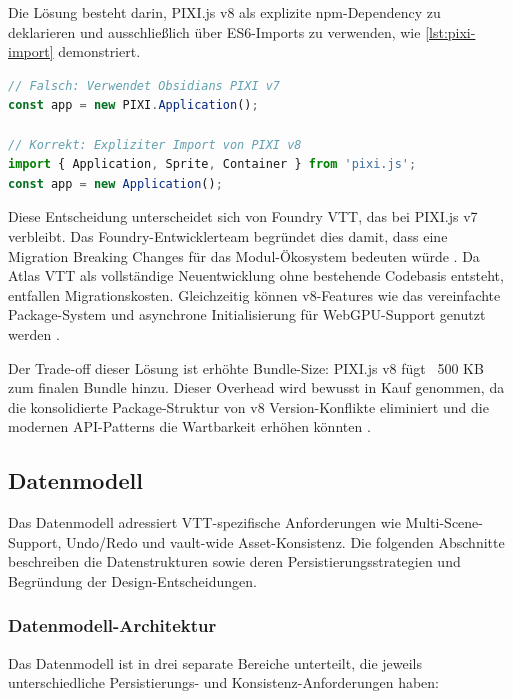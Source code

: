 Die Lösung besteht darin, PIXI.js v8 als explizite npm-Dependency zu deklarieren und ausschließlich über ES6-Imports zu verwenden, wie \autoref{lst:pixi-import} demonstriert.

\begin{lstlisting}[float,language=TypeScript,caption={PIXI.js v8 Import Pattern},label=lst:pixi-import]
// Falsch: Verwendet Obsidians PIXI v7
const app = new PIXI.Application();

// Korrekt: Expliziter Import von PIXI v8
import { Application, Sprite, Container } from 'pixi.js';
const app = new Application();
\end{lstlisting}

Diese Entscheidung unterscheidet sich von Foundry \ac{VTT}, das bei PIXI.js v7 verbleibt. Das Foundry-Entwicklerteam begründet dies damit, dass eine Migration Breaking Changes für das Modul-Ökosystem bedeuten würde \autocite{FoundryIssue11183}. Da Atlas \ac{VTT} als vollständige Neuentwicklung ohne bestehende Codebasis entsteht, entfallen Migrationskosten. Gleichzeitig können v8-Features wie das vereinfachte Package-System und asynchrone Initialisierung für WebGPU-Support genutzt werden \autocite{PixiV8Migration2024}.

Der Trade-off dieser Lösung ist erhöhte Bundle-Size: PIXI.js v8 fügt ~500 \ac{KB} zum finalen Bundle hinzu. Dieser Overhead wird bewusst in Kauf genommen, da die konsolidierte Package-Struktur von v8 Version-Konflikte eliminiert und die modernen \ac{API}-Patterns die Wartbarkeit erhöhen könnten \autocite{PixiV8Migration2024}.

\subsection{Datenmodell}
\label{subsec:Datenmodell}

Das Datenmodell adressiert \ac{VTT}-spezifische Anforderungen wie Multi-Scene-Support, Undo/Redo und vault-wide Asset-Konsistenz. Die folgenden Abschnitte beschreiben die Datenstrukturen sowie deren Persistierungsstrategien und Begründung der Design-Entscheidungen.

\subsubsection{Datenmodell-Architektur}

Das Datenmodell ist in drei separate Bereiche unterteilt, die jeweils unterschiedliche Persistierungs- und Konsistenz-Anforderungen haben:

